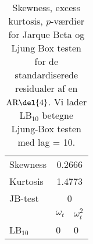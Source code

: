 \begin{table}
\center
\begin{tabular}{lll} \toprule
Skewness & \multicolumn{2}{c}{0.2666} \\
Kurtosis & \multicolumn{2}{c}{1.4773} \\
JB-test & \multicolumn{2}{c}{0} \\ \cmidrule{2-3}	
& $\omega_t$ & $\omega_t^2$ \\
LB$_{10}$ & 0 & 0  \\ \bottomrule
\end{tabular}
\caption{Skewness, excess kurtosis, \(p\)-værdier for Jarque Beta og Ljung Box testen for de standardiserede residualer af en \(\text{AR} \del{4}\). Vi lader LB$_{10}$ betegne Ljung-Box testen med lag = 10. } \label{tab:test_ar}
\end{table}